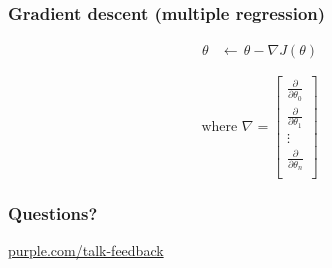 \begin{frame}
  \frametitle{Gradient descent (multiple regression)}

  \begin{bphrase}
    \begin{align*}
      \theta & \leftarrow\, \theta - \nabla J(\theta)
    \end{align*}

    \begin{displaymath}
      \mbox{where } \nabla =
      \begin{bmatrix}
        \frac{\partial}{\partial\theta_0} \\[2mm]
        \frac{\partial}{\partial\theta_1} \\[2mm]
        \vdots\\[2mm]
        \frac{\partial}{\partial\theta_n} \\
      \end{bmatrix}
    \end{displaymath}
  \end{bphrase}
\end{frame}

\begin{frame}
  \frametitle{}

\end{frame}


\begin{frame}
  \frametitle{Questions?}
  \centerline{\large\url{purple.com/talk-feedback}}
\end{frame}


